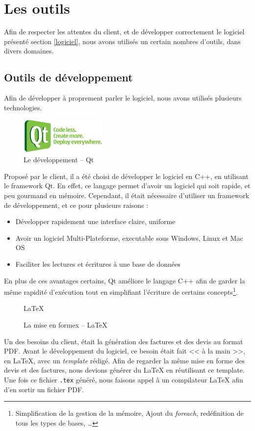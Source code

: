 \section{Les outils}
Afin de respecter les attentes du client, et de développer correctement le logiciel présenté section \ref{logiciel}, nous avons utilisés un
certain nombres d'outils, dans divers domaines.

\subsection{Outils de développement}
Afin de développer à proprement parler le logiciel, nous avons utilisés plusieurs technologies. 

\begin{figure}
\begin{center}
\includegraphics[width=0.38\textwidth]{../beamer/logos/qt.png}
\end{center}
\caption{Le développement -- Qt}
\end{figure}
Proposé par le client, il a été choisi de développer le logiciel en C++, en utilisant le framework Qt. 
En effet, ce langage permet d'avoir un logiciel qui soit rapide, et peu gourmand en mémoire. Cependant, il était nécessaire d'utiliser un
framework de développement, et ce pour plusieurs raisons : 
\begin{itemize}
	\item Développer rapidement une interface claire, uniforme
	\item Avoir un logiciel Multi-Plateforme, executable sous Windows, Linux et Mac OS
	\item Faciliter les lectures et écritures à une base de données 
\end{itemize}
En plus de ces avantages certains, Qt améliore le langage C++ afin de garder la même rapidité d'exécution tout en simplifiant l'écriture de
certains concepts\footnote{Simplification de la gestion de la mémoire, Ajout du \textit{foreach}, redéfinition de tous les types de bases, …}.

\newpage
\begin{figure}
\begin{center}
	\Huge \LaTeX
\end{center}
\caption{La mise en formex -- \LaTeX}
\end{figure}
Un des besoins du client, était la génération des factures et des devis au format PDF. Avant le développement du logiciel, ce besoin était
fait << à la main >>, en \LaTeX{}, avec un \textit{template} rédigé. Afin de regarder la même mise en forme des devis et des factures, nous
devions générer du \LaTeX{} en réutilisant ce template.\\ Une fois ce fichier \texttt{.tex} généré, nous faisons appel à un compilateur \LaTeX{} afin d'en sortir un fichier PDF.

